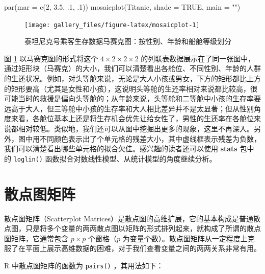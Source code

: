 \documentclass[
  b5paper,
  UTF8,twoside]{book}
\newenvironment{Shaded}{\begin{snugshade}}{\end{snugshade}}
\newcommand{\AttributeTok}[1]{\textcolor[rgb]{0.77,0.63,0.00}{#1}}
\newcommand{\ConstantTok}[1]{\textcolor[rgb]{0.00,0.00,0.00}{#1}}
\newcommand{\DecValTok}[1]{\textcolor[rgb]{0.00,0.00,0.81}{#1}}
\newcommand{\FloatTok}[1]{\textcolor[rgb]{0.00,0.00,0.81}{#1}}
\newcommand{\FunctionTok}[1]{\textcolor[rgb]{0.00,0.00,0.00}{#1}}
\newcommand{\NormalTok}[1]{#1}
\newcommand{\StringTok}[1]{\textcolor[rgb]{0.31,0.60,0.02}{#1}}
\begin{document}
\begin{Shaded}
\begin{Highlighting}[]
\FunctionTok{par}\NormalTok{(}\AttributeTok{mar =} \FunctionTok{c}\NormalTok{(}\DecValTok{2}\NormalTok{, }\FloatTok{3.5}\NormalTok{, .}\DecValTok{1}\NormalTok{, .}\DecValTok{1}\NormalTok{))}
\FunctionTok{mosaicplot}\NormalTok{(Titanic, }\AttributeTok{shade =} \ConstantTok{TRUE}\NormalTok{, }\AttributeTok{main =} \StringTok{""}\NormalTok{)}
\end{Highlighting}
\end{Shaded}

\begin{figure}

{\centering \texttt{[image: gallery\_files/figure-latex/mosaicplot-1]} 

}

\caption[泰坦尼克号乘客生存数据马赛克图]{泰坦尼克号乘客生存数据马赛克图：按性别、年龄和船舱等级划分}\label{fig:mosaicplot}
\end{figure}

图 \ref{fig:mosaicplot} 以马赛克图的形式将这个 \(4\times2\times2\times2\) 的列联表数据展示在了同一张图中，通过矩形块（马赛克）的大小，我们可以清楚看出各舱位、不同性别、年龄的人群的生还状况。例如，对头等舱来说，无论是大人小孩或男女，下方的矩形都比上方的矩形要高（尤其是女性和小孩），这说明头等舱的生还率相对来说都比较高，很可能当时的救援是偏向头等舱的；从年龄来说，头等舱和二等舱中小孩的生存率要远高于大人，但三等舱中小孩的生存率和大人相比差异并不是太显著；但从性别角度来看，各舱位基本上还是将生存机会优先让给女性了，男性的生还率在各舱位来说都相对较低。类似地，我们还可以从图中挖掘出更多的现象，这里不再深入。另外，图中用不同颜色表示出了个单元格的残差大小，其中虚线框表示残差为负数，我们可以清楚看出哪些单元格的拟合欠佳。感兴趣的读者还可以使用 \textbf{stats} 包中的 \texttt{loglin()} 函数拟合对数线性模型、从统计模型的角度继续分析。

\hypertarget{sec:scatterplot-matrix}{%
\section{散点图矩阵}\label{sec:scatterplot-matrix}}

散点图矩阵（Scatterplot Matrices）是散点图的高维扩展，它的基本构成是普通散点图，只是将多个变量的两两散点图以矩阵的形式排列起来，就构成了所谓的散点图矩阵，它通常包含 \(p\times p\) 个窗格（\(p\) 为变量个数）。散点图矩阵从一定程度上克服了在平面上展示高维数据的困难，对于我们查看变量之间的两两关系非常有用。

R 中散点图矩阵的函数为 \texttt{pairs()} ，其用法如下：
\end{document}
